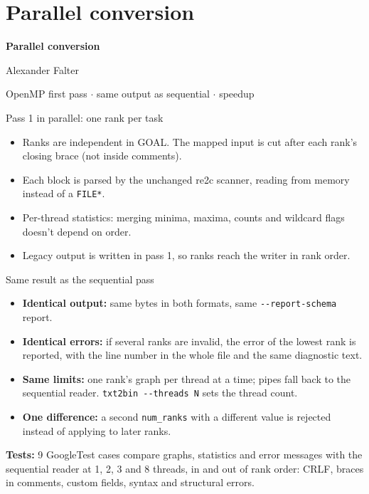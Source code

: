 \documentclass[aspectratio=169,11pt]{beamer}
\newcommand{\highlight}[1]{\colorbox{cream}{\parbox{\dimexpr\linewidth-2\fboxsep}{\small #1}}}
\begin{document}
\section{Parallel conversion}

\begin{frame}
\centering\vfill
{\Huge\bfseries Parallel conversion\par}
\vspace{4mm}
{\large Alexander Falter\par}
\vspace{3mm}
{\small\color{black!60}OpenMP first pass $\cdot$ same output as sequential $\cdot$ speedup\par}
\vfill
\end{frame}

\begin{frame}{Pass 1 in parallel: one rank per task}
{\centering\resizebox{0.78\linewidth}{!}{}\par}
\vspace{1mm}
\footnotesize
\begin{itemize}
\item Ranks are independent in GOAL. The mapped input is cut after each rank's closing brace (not inside comments).
\item Each block is parsed by the unchanged re2c scanner, reading from memory instead of a \texttt{FILE*}.
\item Per-thread statistics: merging minima, maxima, counts and wildcard flags doesn't depend on order.
\item Legacy output is written in pass 1, so ranks reach the writer in rank order.
\end{itemize}
\end{frame}

\begin{frame}{Same result as the sequential pass}
\small
\begin{itemize}
\item \textbf{Identical output:} same bytes in both formats, same \texttt{-{}-report-schema} report.
\item \textbf{Identical errors:} if several ranks are invalid, the error of the lowest rank is reported, with the line number in the whole file and the same diagnostic text.
\item \textbf{Same limits:} one rank's graph per thread at a time; pipes fall back to the sequential reader. \texttt{txt2bin -{}-threads N} sets the thread count.
\item \textbf{One difference:} a second \texttt{num\_ranks} with a different value is rejected instead of applying to later ranks.
\end{itemize}
\vspace{2mm}
\highlight{\textbf{Tests:} 9 GoogleTest cases compare graphs, statistics and error messages with the sequential reader at 1, 2, 3 and 8 threads, in and out of rank order: CRLF, braces in comments, custom fields, syntax and structural errors.}
\end{frame}
\end{document}
